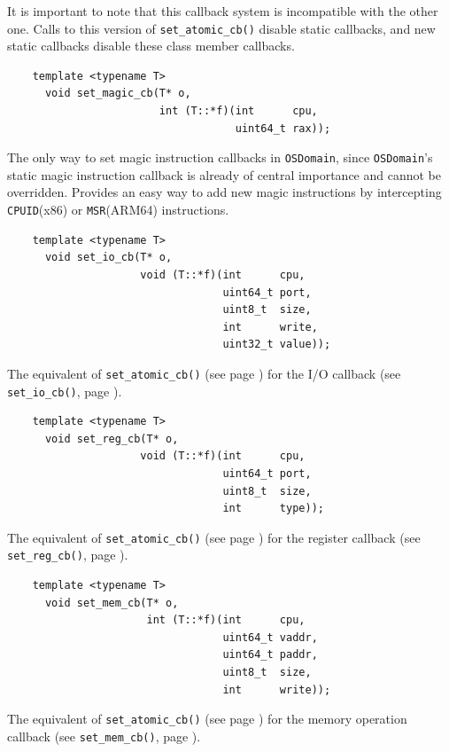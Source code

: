 \documentclass[letterpaper, 10pt]{book}
\begin{document}
It is important to note that this callback system is incompatible with the
other one. Calls to this version of \texttt{set\_atomic\_cb()} disable static
callbacks, and new static callbacks disable these class member callbacks.

\label{tf:set_magic_cb} \begin{verbatim}
    template <typename T>
      void set_magic_cb(T* o,
                        int (T::*f)(int      cpu, 
                                    uint64_t rax));
\end{verbatim}
The only way to set magic instruction callbacks in \texttt{OSDomain}, since
\texttt{OSDomain}'s static magic instruction callback is already of central
importance and cannot be overridden. Provides an easy way to add new magic
instructions by intercepting \texttt{CPUID}(x86) or \texttt{MSR}(ARM64)
instructions.

\label{tf:set_io_cb} \begin{verbatim}
    template <typename T>
      void set_io_cb(T* o,
                     void (T::*f)(int      cpu, 
                                  uint64_t port,
                                  uint8_t  size, 
                                  int      write,
                                  uint32_t value));
\end{verbatim}
The equivalent of \texttt{set\_atomic\_cb()} (see page
\pageref{tf:set_atomic_cb}) for the I/O callback (see \texttt{set\_io\_cb()}, 
page \pageref{func:set_io_cb}).

\label{tf:set_reg_cb} \begin{verbatim} 
    template <typename T>
      void set_reg_cb(T* o,
                     void (T::*f)(int      cpu,
                                  uint64_t port,
                                  uint8_t  size,
                                  int      type));
\end{verbatim}
The equivalent of \texttt{set\_atomic\_cb()} (see page
\pageref{tf:set_atomic_cb}) for the register callback (see 
\texttt{set\_reg\_cb()}, page \pageref{func:set_reg_cb}).


\label{tf:set_mem_cb} \begin{verbatim}
    template <typename T>
      void set_mem_cb(T* o,
                      int (T::*f)(int      cpu,
                                  uint64_t vaddr, 
                                  uint64_t paddr,
                                  uint8_t  size,
                                  int      write));
\end{verbatim}
The equivalent of \texttt{set\_atomic\_cb()} (see page 
\pageref{tf:set_atomic_cb}) for the memory operation callback (see 
\texttt{set\_mem\_cb()}, page \pageref{func:set_mem_cb}).
\end{document}
